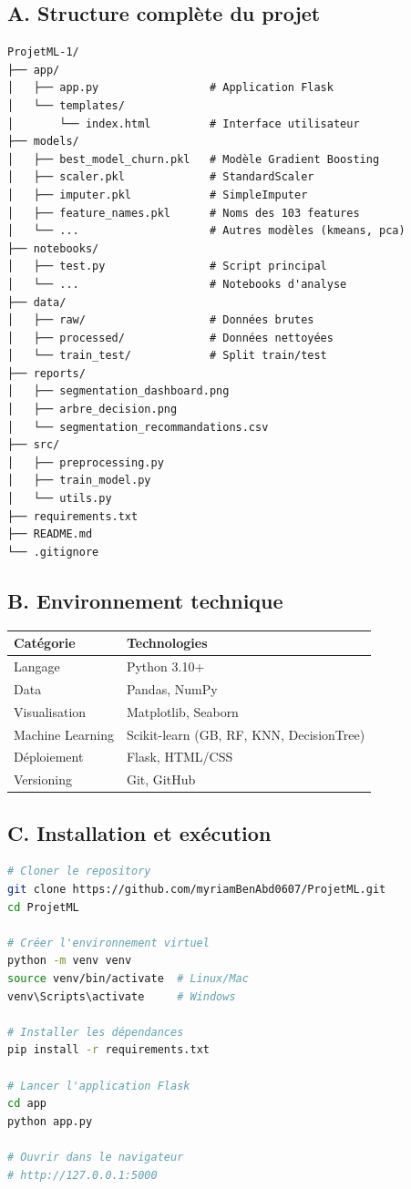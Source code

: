 \documentclass[11pt,a4paper]{article}
\begin{document}
\subsection*{A. Structure complète du projet}
\begin{verbatim}
ProjetML-1/
├── app/
│   ├── app.py                 # Application Flask
│   └── templates/
│       └── index.html         # Interface utilisateur
├── models/
│   ├── best_model_churn.pkl   # Modèle Gradient Boosting
│   ├── scaler.pkl             # StandardScaler
│   ├── imputer.pkl            # SimpleImputer
│   ├── feature_names.pkl      # Noms des 103 features
│   └── ...                    # Autres modèles (kmeans, pca)
├── notebooks/
│   ├── test.py                # Script principal
│   └── ...                    # Notebooks d'analyse
├── data/
│   ├── raw/                   # Données brutes
│   ├── processed/             # Données nettoyées
│   └── train_test/            # Split train/test
├── reports/
│   ├── segmentation_dashboard.png
│   ├── arbre_decision.png
│   └── segmentation_recommandations.csv
├── src/
│   ├── preprocessing.py
│   ├── train_model.py
│   └── utils.py
├── requirements.txt
├── README.md
└── .gitignore
\end{verbatim}

\subsection*{B. Environnement technique}
\begin{table}[H]
\centering
\begin{tabular}{L{4cm} L{6cm}}
\toprule
\textbf{Catégorie} & \textbf{Technologies} \\
\midrule
Langage & Python 3.10+ \\
Data & Pandas, NumPy \\
Visualisation & Matplotlib, Seaborn \\
Machine Learning & Scikit-learn (GB, RF, KNN, DecisionTree) \\
Déploiement & Flask, HTML/CSS \\
Versioning & Git, GitHub \\
\bottomrule
\end{tabular}
\end{table}

\subsection*{C. Installation et exécution}
\begin{lstlisting}[language=bash]
# Cloner le repository
git clone https://github.com/myriamBenAbd0607/ProjetML.git
cd ProjetML

# Créer l'environnement virtuel
python -m venv venv
source venv/bin/activate  # Linux/Mac
venv\Scripts\activate     # Windows

# Installer les dépendances
pip install -r requirements.txt

# Lancer l'application Flask
cd app
python app.py

# Ouvrir dans le navigateur
# http://127.0.0.1:5000
\end{lstlisting}
\end{document}
